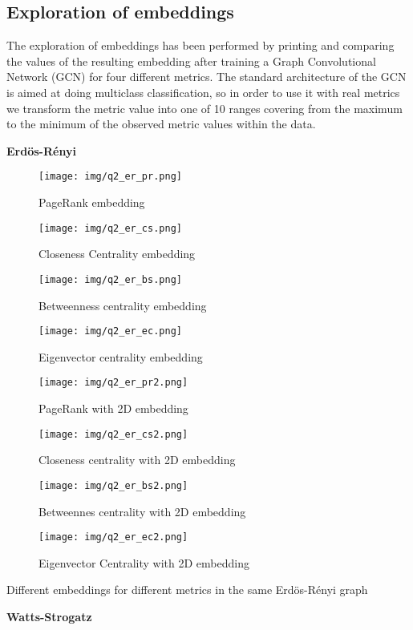 \documentclass[a4paper]{article}
\begin{document}
\subsection{Exploration of embeddings}

The exploration of embeddings has been performed by printing and comparing the values of the resulting embedding after training a Graph Convolutional Network (GCN) for four different metrics. The standard architecture of the GCN is aimed at doing multiclass classification, so in order to use it with real metrics we transform the metric value into one of 10 ranges covering from the maximum to the minimum of the observed metric values within the data.

\textbf{Erdös-Rényi}

\begin{figure}[H]
%
  \centering
    \texttt{[image: img/q2\_er\_pr.png]}
    \caption{PageRank embedding}\label{com02}
\endminipage
{}%
  \centering
    \texttt{[image: img/q2\_er\_cs.png]}
    \caption{Closeness Centrality embedding}\label{com03}
\endminipage
{}%
  \centering
    \texttt{[image: img/q2\_er\_bs.png]}
    \caption{Betweenness centrality  embedding}
\endminipage
{}%
  \centering
    \texttt{[image: img/q2\_er\_ec.png]}
    \caption{Eigenvector centrality embedding}
\endminipage\vfill

%
  \centering
    \texttt{[image: img/q2\_er\_pr2.png]}
    \caption{PageRank with 2D embedding}\label{com02}
\endminipage
{}%
  \centering
    \texttt{[image: img/q2\_er\_cs2.png]}
    \caption{Closeness centrality with 2D embedding}
\endminipage
{}%
  \centering
    \texttt{[image: img/q2\_er\_bs2.png]}
    \caption{Betweennes centrality with 2D embedding}
\endminipage\hfill
{}%
  \centering
    \texttt{[image: img/q2\_er\_ec2.png]}
    \caption{Eigenvector Centrality with 2D embedding}
\endminipage\vfill

\end{figure}\caption{Different embeddings for different metrics in the same Erdös-Rényi graph}




\textbf{Watts-Strogatz}
\end{document}
